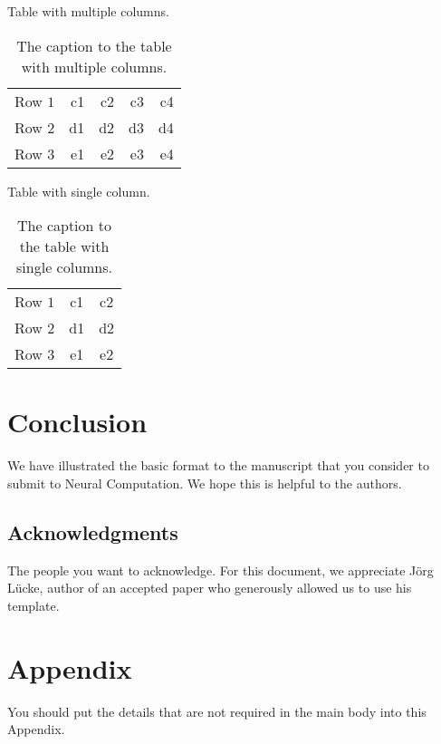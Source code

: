 \documentclass[12pt]{article}
\begin{document}
Table with multiple columns.
\begin{table}[h]
\renewcommand{\arraystretch}{1.3}
\caption{The caption to the table with multiple columns.}
\begin{center}
\begin{tabular}{|l|rr|rr|}\hline
   Row $1$          &   c1   &    c2    &  c3  &   c4 \\
   Row $2$          &   d1   &    d2    &  d3  &   d4\\
   Row $3$          &   e1   &    e2    &  e3  &  e4 \\\hline
\end{tabular}
\end{center}
\end{table}

Table with single column.
\begin{table}[h]
\renewcommand{\arraystretch}{1.3}
\caption{The caption to the table with single columns.}
\begin{center}
\begin{tabular}{|l|c|c|}\hline
   Row $1$          &   c1  &   c2   \\
   Row $2$          &   d1  &   d2   \\
   Row $3$          &   e1  &   e2 \\\hline
\end{tabular}
\end{center}
\end{table}

\section*{Conclusion}
We have illustrated the basic format to the manuscript that you consider to submit to Neural Computation. We hope this is helpful to the authors.

\subsection*{Acknowledgments}
The people you want to acknowledge. For this document, we appreciate Jörg Lücke, author of an accepted paper who generously allowed us to use his template.

\section*{Appendix}
You should put the details that are not required in the main body into this Appendix.
\end{document}
